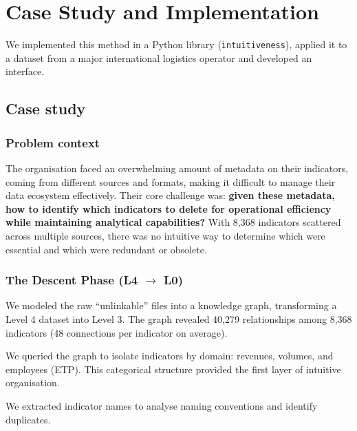 \documentclass[12pt,a4paper]{article}
\begin{document}
\section{Case Study and Implementation}
\label{sec:case-study}


We implemented this method in a Python library (\texttt{intuitiveness}), applied it to a dataset from a major international logistics operator and developed an interface. 

\subsection{Case study}

\subsubsection{Problem context}
The organisation faced an overwhelming amount of metadata on their indicators, coming from different sources and formats, making it difficult to manage their data ecosystem effectively. Their core challenge was: \textbf{given these metadata, how to identify which indicators to delete for operational efficiency while maintaining analytical capabilities?} With 8,368 indicators scattered across multiple sources, there was no intuitive way to determine which were essential and which were redundant or obsolete.

\subsubsection{The Descent Phase (L4 $\to$ L0)}

\vspace{1em}

We modeled the raw ``unlinkable'' files into a knowledge graph, transforming a Level 4 dataset into Level 3. The graph revealed 40,279 relationships among 8,368 indicators (48 connections per indicator on average).

\vspace{1em}

We queried the graph to isolate indicators by domain: revenues, volumes, and employees (ETP). This categorical structure provided the first layer of intuitive organisation.

\vspace{1em}

We extracted indicator names to analyse naming conventions and identify duplicates.
\end{document}
